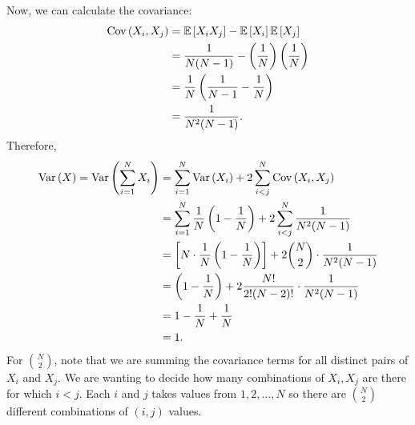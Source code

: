 \begin{example}
    Now, we can calculate the covariance:
    \begin{align*}
        \operatorname{Cov}\left({X_i,X_j}\right) &= \mathbb{E}\left[{X_i X_j}\right] - \mathbb{E}\left[{X_i}\right]\mathbb{E}\left[{X_j}\right] \\
        &= \frac{1}{N(N-1)} - \left( \frac{1}{N} \right) \left( \frac{1}{N} \right) \\
        &= \frac{1}{N} \left( \frac{1}{N-1} - \frac{1}{N} \right) \\
        &= \frac{1}{N^2 (N-1)}.
    \end{align*}
    Therefore,
    \begin{align*}
        \operatorname{Var}\left({X}\right) = \operatorname{Var}\left({\displaystyle \sum_{i=1}^{N} X_i}\right) &= \displaystyle \sum_{i=1}^{N} \operatorname{Var}\left({X_i}\right) + 2 \displaystyle \sum_{i < j}^{N} \operatorname{Cov}\left({X_i,X_j}\right) \\
        &= \displaystyle \sum_{i=1}^{N} \frac{1}{N} \left( 1 - \frac{1}{N} \right) + 2 \displaystyle \sum_{i<j}^{N} \frac{1}{N^2 (N-1)} \\
        &= \left[ N \cdot \frac{1}{N} \left( 1 - \frac{1}{N} \right) \right] + 2 \binom{N}{2} \cdot \frac{1}{N^2 (N-1)} \\
        &= \left( 1 - \frac{1}{N} \right) + 2 \frac{N!}{2! (N-2)!} \cdot \frac{1}{N^2 (N-1)} \\
        &= 1 - \frac{1}{N} + \frac{1}{N} \\
        &= 1.
    \end{align*}
    For $\binom{N}{2}$, note that we are summing the covariance terms for all distinct pairs of $X_i$ and $X_j$. We are wanting to decide how many combinations of $X_i,X_j$ are there for which $i < j$. Each $i$ and $j$ takes values from $1,2,\ldots,N$ so there are $\binom{N}{2}$ different combinations of $(i,j)$ values.
\end{example}





\newpage